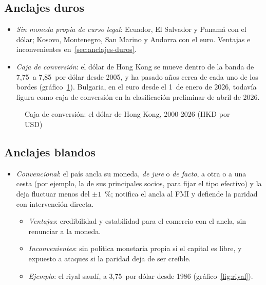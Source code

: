 \documentclass[11pt]{article}
\begin{document}
\subsection{Anclajes duros}\label{anexo:regimenes-duros}

\begin{itemize}
\item \emph{Sin moneda propia de curso legal}: Ecuador, El Salvador y Panamá con el dólar; Kosovo, Montenegro, San Marino y Andorra con el euro. Ventajas e inconvenientes en~\ref{sec:anclajes-duros}.
\item \emph{Caja de conversión}: el dólar de Hong Kong se mueve dentro de la banda de 7,75~a 7,85~por dólar desde 2005, y ha pasado años cerca de cada uno de los bordes (gráfico~\ref{fig:hong-kong}). Bulgaria, en el euro desde el 1~de enero de 2026, todavía figura como caja de conversión en la clasificación preliminar de abril de 2026\nocite{FMI2026InformeAnual}.
\end{itemize}

\begin{figure}[H]
\centering
\caption{Caja de conversión: el dólar de Hong Kong, 2000-2026 (HKD por USD)}\label{fig:hong-kong}
\end{figure}

\subsection{Anclajes blandos}\label{anexo:regimenes-blandos}

\begin{itemize}
\item \emph{Convencional}: el país ancla su moneda, \emph{de jure} o \emph{de facto}, a otra o a una cesta (por ejemplo, la de sus principales socios, para fijar el tipo efectivo) y la deja fluctuar menos del $\pm1$~\%; notifica el ancla al FMI y defiende la paridad con intervención directa.
  \begin{itemize}
  \item \emph{Ventajas}: credibilidad y estabilidad para el comercio con el ancla, sin renunciar a la moneda.
  \item \emph{Inconvenientes}: sin política monetaria propia si el capital es libre, y expuesto a ataques si la paridad deja de ser creíble.
  \item \emph{Ejemplo}: el riyal saudí, a 3,75~por dólar desde 1986 (gráfico~\ref{fig:riyal}).
  \end{itemize}
\end{itemize}
\end{document}
